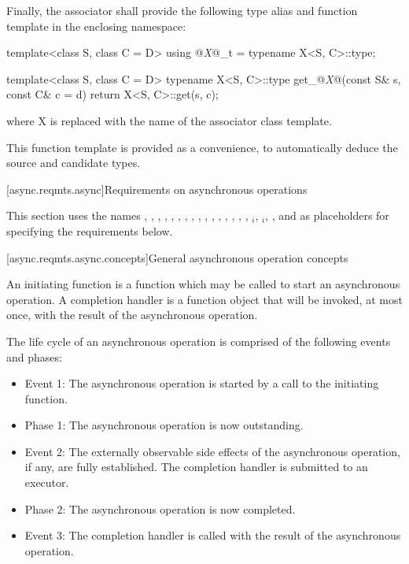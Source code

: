 \pnum
 Finally, the associator shall provide the following type alias and function template in the enclosing namespace:

\begin{codeblock}
template<class S, class C = D> using @\textit{X}@_t = typename X<S, C>::type;

template<class S, class C = D>
typename X<S, C>::type get_@\textit{X}@(const S& s, const C& c = d)
{
  return X<S, C>::get(s, c);
}
\end{codeblock}

where X is replaced with the name of the associator class template. \begin{note} This function template is provided as a convenience, to automatically deduce the source and candidate types. \end{note}



[async.reqmts.async]{Requirements on asynchronous operations}

\pnum
This section uses the names , , , , , , , , , , , , , , , , $_i$, $_i$, , and  as placeholders for specifying the requirements below.


[async.reqmts.async.concepts]{General asynchronous operation concepts}

\pnum
An initiating function is a function which may be called to start an asynchronous operation. A completion handler is a function object that will be invoked, at most once, with the result of the asynchronous operation.

\pnum
 The life cycle of an asynchronous operation is comprised of the following events and phases:

\begin{itemize}
\item
Event 1: The asynchronous operation is started by a call to the initiating function.

\item
Phase 1: The asynchronous operation is now outstanding.

\item
Event 2: The externally observable side effects of the asynchronous operation, if any, are fully established. The completion handler is submitted to an executor.

\item
Phase 2: The asynchronous operation is now completed.

\item
Event 3: The completion handler is called with the result of the asynchronous operation.
\end{itemize}

